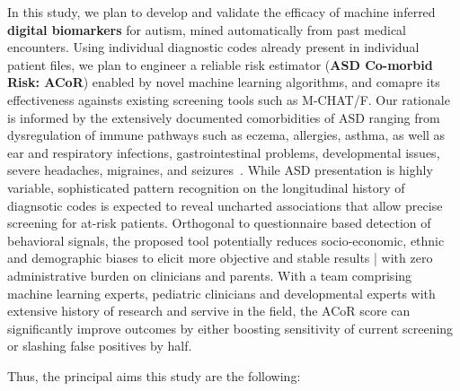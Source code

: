 \documentclass[onecolumn, compsoc,11pt]{IEEEtran}
\newcommand\guline{\bgroup\markoverwith
{\textcolor{black!30}{\rule[-0.45ex]{2pt}{0.4pt}}}\ULon}
\newcommand\hilitx[1]{\guline{#1}}
\def\ZERO{ACoR\xspace}
\begin{document}
In this study, we plan to develop and validate the efficacy of machine inferred \textbf{digital biomarkers} for autism, mined automatically from past medical encounters. Using individual diagnostic codes already present in individual patient files, we plan to engineer a reliable risk estimator ({\bf ASD Co-morbid Risk: \ZERO}) enabled by novel  machine learning algorithms, and comapre its effectiveness againsts existing screening tools such as M-CHAT/F. Our rationale is informed by the extensively documented comorbidities of ASD ranging from dysregulation of immune pathways such as eczema, allergies, asthma, as well as ear and respiratory infections, gastrointestinal problems, developmental issues, severe headaches, migraines, and seizures~\cite{pmid30733689,pmid22511918}. While ASD presentation is highly variable, sophisticated pattern recognition on the longitudinal history of  diagnsotic codes is expected to reveal uncharted associations that allow precise screening for at-risk patients.
Orthogonal to  questionnaire based  detection of behavioral signals, the proposed tool potentially reduces socio-economic, ethnic and demographic biases to elicit more  objective and stable results |  with zero  administrative burden on clinicians and parents. With a team comprising machine learning experts, pediatric clinicians and developmental experts with extensive history of research and servive in the field,
the \ZERO score can significantly improve outcomes by either boosting sensitivity of current screening or slashing false positives by half.

Thus, the principal aims  this study are the following:
     
\end{document}
